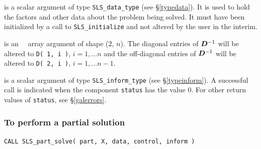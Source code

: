 \documentclass{galahad}
\newcommand{\packagename}{SLS}
\begin{document}
\begin{description}

 is a scalar \intentinout argument of type
{\tt \packagename\_data\_type}
(see \S\ref{typedata}). It is used to hold the factors and other
data about the problem being solved.
It must have been initialized by a call to
{\tt \packagename\_ini\-tialize} and not altered by the user in the interim.

 is an \intentinout\ \realdp\ array argument of shape ($2$, $n$).
The diagonal entries of ${\bm{D}}^{-1} $ will
be altered to {\tt D( 1, i )}, $i = 1, \ldots n$ and the off-diagonal
entries of ${\bm{D}}^{-1} $ will be altered to {\tt D( 2, i )},
$i = 1, \ldots n-1$.

 is a scalar \intentinout argument of type
{\tt \packagename\_inform\_type}
(see \S\ref{typeinform}).
A successful call is indicated when the  component {\tt status} has the value 0.
For other return values of {\tt status}, see \S\ref{galerrors}.

\end{description}

\subsubsection{To perform a partial solution}

\hskip0.5in
{\tt CALL \packagename\_part\_solve( part, X, data, control, inform )}
\end{document}
